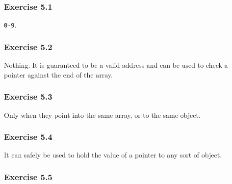   

 

  

  \subsubsection*{Exercise 5.1}

   \texttt{0-9}.


  

  \subsubsection*{Exercise 5.2}

   Nothing. It is guaranteed to be a valid address and can be used to check
    a pointer against the end of the array.


  

  \subsubsection*{Exercise 5.3}

   Only when they point into the same array, or to the same object.


  

  \subsubsection*{Exercise 5.4}

   It can safely be used to hold the value of a pointer to any sort of
    object.


  

  \subsubsection*{Exercise 5.5}

